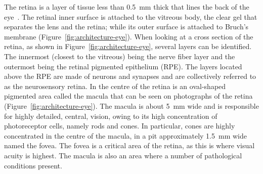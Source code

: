 \documentclass{article}
\begin{document}
The retina is a layer of tissue less than \SI{0.5}{\mm} thick that lines the back of the eye~\cite{Gupta_2015}.
The retinal inner surface is attached to the vitreous body, the clear gel that separates the lens and the retina; while its outer surface is attached to Bruch's membrane (Figure~\ref{fig:architecture-eye}).
When looking at a cross section of the retina, as shown in Figure~\ref{fig:architecture-eye}, several layers can be identified. The innermost (closest to the vitreous) being the nerve fiber layer and the outermost being the retinal pigmented epithelium (RPE).
The layers located above the RPE are made of neurons and synapses and are collectively referred to as the neurosensory retina.
In the centre of the retina is an oval-shaped pigmented area called the macula that can be seen on photographs of the retina (Figure~\ref{fig:architecture-eye}).
The macula is about \SI{5}{\mm} wide and is responsible for highly detailed, central, vision, owing to its high concentration of photoreceptor cells, namely rods and cones.
In particular, cones are highly concentrated in the centre of the macula, in a pit approximately \SI{1.5}{\mm} wide named the fovea.
The fovea is a critical area of the retina, as this is where visual acuity is highest.
The macula is also an area where a number of pathological conditions present.
\end{document}

